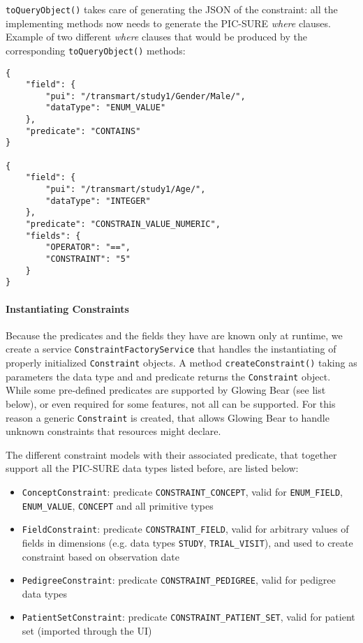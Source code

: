 \verb|toQueryObject()| takes care of generating the JSON of the constraint: all the implementing methods now needs to generate the PIC-SURE \emph{where} clauses.
Example of two different \emph{where} clauses that would be produced by the corresponding \verb|toQueryObject()| methods:
\begin{verbatim}
{
    "field": {
        "pui": "/transmart/study1/Gender/Male/",
        "dataType": "ENUM_VALUE"
    },
    "predicate": "CONTAINS"
}

{
    "field": {
        "pui": "/transmart/study1/Age/",
        "dataType": "INTEGER"
    },
    "predicate": "CONSTRAIN_VALUE_NUMERIC",
    "fields": {
        "OPERATOR": "==",
        "CONSTRAINT": "5"
    }
}
\end{verbatim}


\paragraph{Instantiating Constraints}
\label{sec:gb-instanciating-constraints}

Because the predicates and the fields they have are known only at runtime, we create a service \verb|ConstraintFactoryService| that handles the instantiating of properly initialized \verb|Constraint| objects.
A method \verb|createConstraint()| taking as parameters the data type and and predicate returns the \verb|Constraint| object.
While some pre-defined predicates are supported by Glowing Bear (see list below), or even required for some features, not all can be supported. 
For this reason a generic \verb|Constraint| is created, that allows Glowing Bear to handle unknown constraints that resources might declare.

The different constraint models with their associated predicate, that together support all the PIC-SURE data types listed before, are listed below:
\begin{itemize}
    \item \verb|ConceptConstraint|: predicate \verb|CONSTRAINT_CONCEPT|, valid for \verb|ENUM_FIELD|, \verb|ENUM_VALUE|, \verb|CONCEPT| and all primitive types 
    \item \verb|FieldConstraint|: predicate \verb|CONSTRAINT_FIELD|, valid for arbitrary values of fields in dimensions (e.g. data types \verb|STUDY|, \verb|TRIAL_VISIT|), and used to create constraint based on observation date
    \item \verb|PedigreeConstraint|: predicate \verb|CONSTRAINT_PEDIGREE|, valid for pedigree data types
    \item \verb|PatientSetConstraint|: predicate \verb|CONSTRAINT_PATIENT_SET|, valid for patient set (imported through the UI)
\end{itemize}

